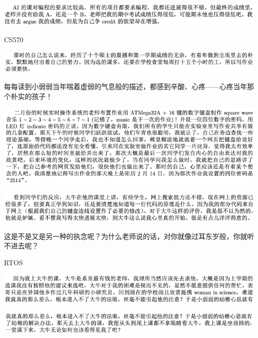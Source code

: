 \documentclass[9pt, b5paper]{article}
\begin{document}
\begin{center}
\includegraphics[width=.9\linewidth]{./pic/backups_plans_20210424_215822.png}
\end{center}

CS570

\begin{center}
\includegraphics[width=.9\linewidth]{./pic/backups_plans_20210424_214439.png}
\end{center}

每每读到小弱弱当年喘着虚弱的气息般的描述，都感到辛酸、心疼——心疼当年那个朴实的孩子！

\begin{center}
\includegraphics[width=.9\linewidth]{./pic/backups_plans_20210424_214802.png}
\end{center}

\begin{center}
\includegraphics[width=.9\linewidth]{./pic/backups_plans_20210424_214908.png}
\end{center}

这是不是又是另一种的执念呢？为什么老师说的话，对你就像过耳东岁般，你就听不进去呢？

RTOS

\begin{center}
\includegraphics[width=.9\linewidth]{./pic/backups_plans_20210424_213859.png}
\end{center}

\begin{center}
\includegraphics[width=.9\linewidth]{./pic/backups_plans_20210424_213910.png}
\end{center}
\end{document}
